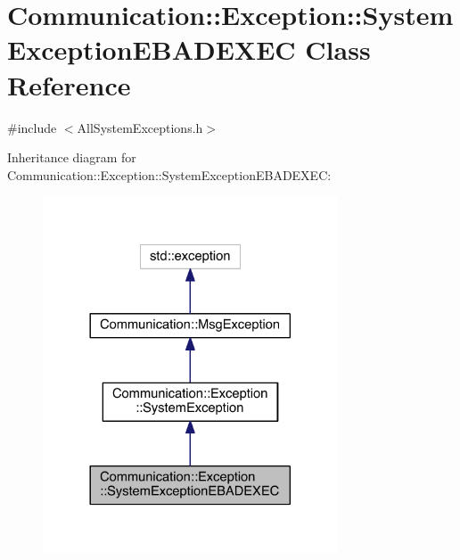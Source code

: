 \hypertarget{class_communication_1_1_exception_1_1_system_exception_e_b_a_d_e_x_e_c}{}\section{Communication\+:\+:Exception\+:\+:System\+Exception\+E\+B\+A\+D\+E\+X\+E\+C Class Reference}
\label{class_communication_1_1_exception_1_1_system_exception_e_b_a_d_e_x_e_c}


{\ttfamily \#include $<$All\+System\+Exceptions.\+h$>$}



Inheritance diagram for Communication\+:\+:Exception\+:\+:System\+Exception\+E\+B\+A\+D\+E\+X\+E\+C\+:\nopagebreak
\begin{figure}[H]
\begin{center}
\leavevmode
\includegraphics[width=248pt]{class_communication_1_1_exception_1_1_system_exception_e_b_a_d_e_x_e_c__inherit__graph}
\end{center}
\end{figure}


